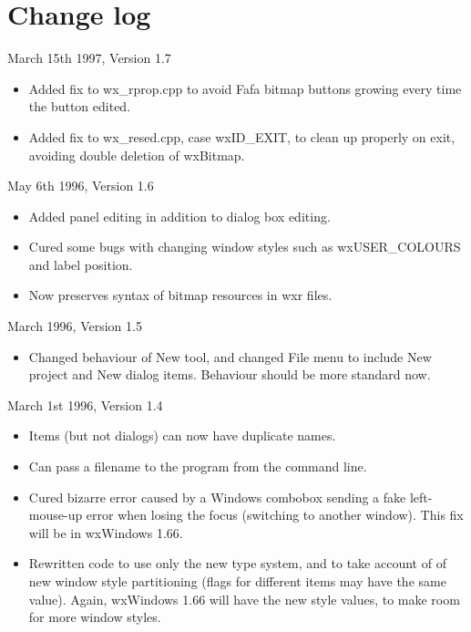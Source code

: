 \chapter{Change log}\label{changes}
%
\setfooter{\thepage}{}{}{}{}{\thepage}%

March 15th 1997, Version 1.7

\begin{itemize}\itemsep=0pt
\item Added fix to wx\_rprop.cpp to avoid Fafa bitmap buttons growing every time the
button edited.
\item Added fix to wx\_resed.cpp, case wxID\_EXIT, to clean up properly on exit, avoiding double deletion of wxBitmap.
\end{itemize}

May 6th 1996, Version 1.6

\begin{itemize}\itemsep=0pt
\item Added panel editing in addition to dialog box editing.
\item Cured some bugs with changing window styles such as wxUSER\_COLOURS and label position.
\item Now preserves syntax of bitmap resources in wxr files.
\end{itemize}

March 1996, Version 1.5

\begin{itemize}\itemsep=0pt
\item Changed behaviour of New tool, and changed File menu to include New project and New dialog items.
Behaviour should be more standard now.
\end{itemize}

March 1st 1996, Version 1.4

\begin{itemize}\itemsep=0pt
\item Items (but not dialogs) can now have duplicate names.
\item Can pass a filename to the program from the command line.
\item Cured bizarre error caused by a Windows combobox sending
a fake left-mouse-up error when losing the focus (switching to another
window). This fix will be in wxWindows 1.66.
\item Rewritten code to use only the new type system, and to take account of
of new window style partitioning (flags for different items may have the same value).
Again, wxWindows 1.66 will have the new style values, to make room for more window
styles.
\end{itemize}

